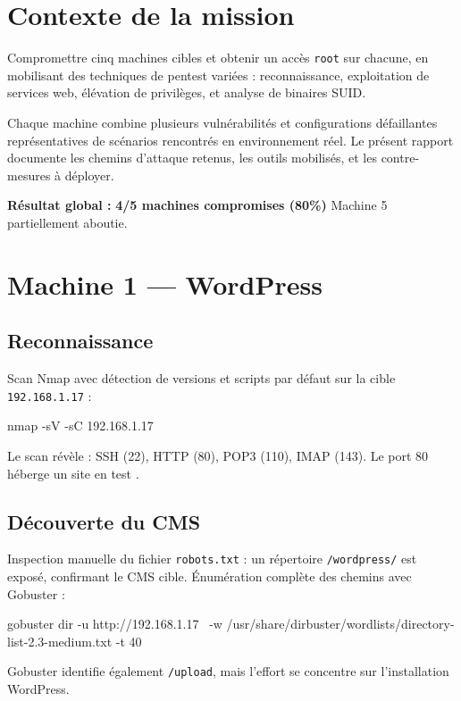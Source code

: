 \documentclass[11pt,a4paper]{article}
\begin{document}
\setcounter{page}{1}

{\sffamily
\hypersetup{linkcolor=primary}
\renewcommand{\contentsname}{\textcolor{accent}{\faList~} Sommaire}
\tableofcontents
}
\vspace{0.4cm}

\section{Contexte de la mission}

\begin{infobox}[title={\faBullseye~Objectif}]
Compromettre cinq machines cibles et obtenir un accès \texttt{root} sur chacune, en mobilisant des techniques de pentest variées : reconnaissance, exploitation de services web, élévation de privilèges, et analyse de binaires SUID.
\end{infobox}

Chaque machine combine plusieurs vulnérabilités et configurations défaillantes représentatives de scénarios rencontrés en environnement réel. Le présent rapport documente les chemins d'attaque retenus, les outils mobilisés, et les contre-mesures à déployer.

\medskip
\noindent\textbf{Résultat global :} \textcolor{accent}{\textbf{4/5 machines compromises (80\%)}} \textemdash{} Machine 5 partiellement aboutie.

\section{Machine 1 — WordPress}

\subsection{Reconnaissance}
Scan Nmap avec détection de versions et scripts par défaut sur la cible \texttt{192.168.1.17} :
\begin{shellbox}
nmap -sV -sC 192.168.1.17
\end{shellbox}
Le scan révèle : SSH (22), HTTP (80), POP3 (110), IMAP (143). Le port 80 héberge un site \og en test \fg{}.

\subsection{Découverte du CMS}
Inspection manuelle du fichier \texttt{robots.txt} : un répertoire \texttt{/wordpress/} est exposé, confirmant le CMS cible. Énumération complète des chemins avec Gobuster :
\begin{shellbox}
gobuster dir -u http://192.168.1.17 \
  -w /usr/share/dirbuster/wordlists/directory-list-2.3-medium.txt -t 40
\end{shellbox}
Gobuster identifie également \texttt{/upload}, mais l'effort se concentre sur l'installation WordPress.
\end{document}
